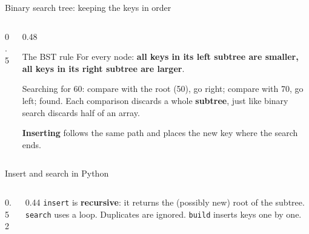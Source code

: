 \documentclass[aspectratio=169,10pt]{beamer}
\newcommand{\fA}{white}\newcommand{\fB}{white}\newcommand{\fC}{white}\newcommand{\fD}{white}
\newcommand{\fE}{white}\newcommand{\fF}{white}\newcommand{\fG}{white}
\newcommand{\bsttree}[7]{%
  \node[tn,fill=\fA] (a) at (0,0) {#1};
  \node[tn,fill=\fB] (b) at (-2,-1.15) {#2};  \node[tn,fill=\fC] (c) at (2,-1.15) {#3};
  \node[tn,fill=\fD] (d) at (-3,-2.3) {#4};   \node[tn,fill=\fE] (e) at (-1,-2.3) {#5};
  \node[tn,fill=\fF] (f) at (1,-2.3) {#6};    \node[tn,fill=\fG] (g) at (3,-2.3) {#7};
  \foreach \p/\q in {a/b,a/c,b/d,b/e,c/f,c/g}{\draw[tdInk!60] (\p) -- (\q);}}
\begin{document}
\begin{frame}{Binary search tree: keeping the keys in order}
\begin{columns}[T]
\begin{column}{0.5\textwidth}
\begin{sfig}[0.62]
\end{sfig}
\end{column}
\begin{column}{0.48\textwidth}
\begin{block}{The BST rule}
{\small For every node: \textbf{all keys in its left subtree are smaller, all keys in its right subtree are larger}.}
\end{block}
\vspace{2mm}
{\small
Searching for 60: compare with the root (50), go right; compare with 70, go left; found. Each comparison discards a whole \textbf{subtree}, just like binary search discards half of an array.

\vspace{2mm}
\textbf{Inserting} follows the same path and places the new key where the search ends.}
\end{column}
\end{columns}
\end{frame}

\begin{frame}{Insert and search in Python}
\begin{columns}[T]
\begin{column}{0.52\textwidth}
\end{column}
\begin{column}{0.44\textwidth}
\vspace{2mm}
\vspace{2mm}
{\small
\texttt{insert} is \textbf{recursive}: it returns the (possibly new) root of the subtree. \texttt{search} uses a loop. Duplicates are ignored. \texttt{build} inserts keys one by one.}
\end{column}
\end{columns}
\end{frame}
\end{document}
